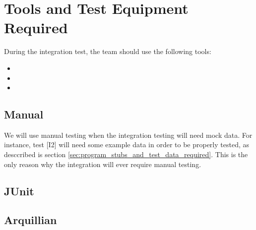 \section{Tools and Test Equipment Required} %
\label{sec:tools_and_test_equipment_required}

During the integration test, the team should use the following tools:
\begin{itemize}
	\item {}
	\item {}
	\item {}
\end{itemize}

\subsection{Manual} %
\label{sub:manual}

We will use manual testing when the integration testing will need mock data.
For instance, test [I2] will need some example data in order to be properly tested, as desccribed is section \ref{sec:program_stubs_and_test_data_required}.
This is the only reason why the integration will ever require manual testing.

\subsection{JUnit} %
\label{sub:junit}




\subsection{Arquillian} %
\label{sub:arquillian}


